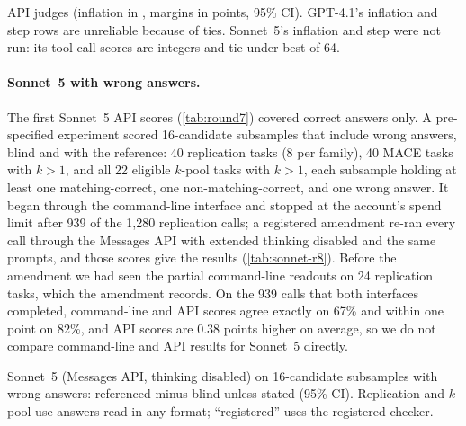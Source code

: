 \begin{table}[htbp]
\centering
\caption{API judges (inflation in \sd, margins in points, 95\% CI). GPT-4.1's inflation and step rows are unreliable because of ties. Sonnet~5's inflation and step were not run: its tool-call scores are integers and tie under best-of-64.\pre}
\label{tab:frontier-api}
\footnotesize
\begin{adjustbox}{max width=\linewidth}\end{adjustbox}

\end{table}

\paragraph{Sonnet~5 with wrong answers.}
The first Sonnet~5 API scores (\cref{tab:round7}) covered correct answers only. A pre-specified experiment scored 16-candidate subsamples that include wrong answers, blind and with the reference: 40 replication tasks (8 per family), 40 \textsc{MACE} tasks with $k{>}1$, and all 22 eligible $k$-pool tasks with $k{>}1$, each subsample holding at least one matching-correct, one non-matching-correct, and one wrong answer. It began through the command-line interface and stopped at the account's spend limit after 939 of the 1,280 replication calls; a registered amendment re-ran every call through the Messages API with extended thinking disabled and the same prompts, and those scores give the results (\cref{tab:sonnet-r8}).\pre{} Before the amendment we had seen the partial command-line readouts on 24 replication tasks, which the amendment records. On the 939 calls that both interfaces completed, command-line and API scores agree exactly on 67\% and within one point on 82\%, and API scores are 0.38 points higher on average, so we do not compare command-line and API results for Sonnet~5 directly.\ph

\begin{table}[htbp]
\centering
\caption{Sonnet~5 (Messages API, thinking disabled) on 16-candidate subsamples with wrong answers: referenced minus blind unless stated (95\% CI). Replication and $k$-pool use answers read in any format; ``registered'' uses the registered checker.\pre}
\label{tab:sonnet-r8}
\footnotesize
\setlength{\tabcolsep}{3pt}
\begin{adjustbox}{max width=\linewidth}\end{adjustbox}
\end{table}

